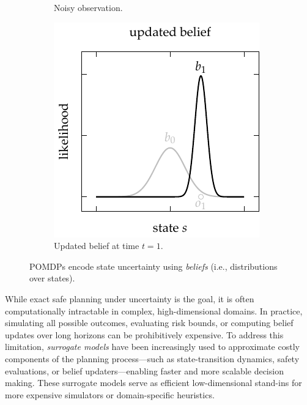 \begin{figure}[t!]
\begin{subfigure}[t]{0.30\linewidth}
        \caption{Noisy observation.}
        \label{fig:belief2}
    \end{subfigure}
    \hfill
    \begin{subfigure}[t]{0.30\linewidth}
        \centering
        \includegraphics[width=\linewidth]{diagrams/introduction/belief3.pdf}
        \caption{Updated belief at time $t=1$.}
        \label{fig:belief3}
    \end{subfigure}
    \caption{POMDPs encode state uncertainty using \textit{beliefs} (i.e., distributions over states).}
    \label{fig:beliefs}
\end{figure}


While exact safe planning under uncertainty is the goal, it is often computationally intractable in complex, high-dimensional domains.
In practice, simulating all possible outcomes, evaluating risk bounds, or computing belief updates over long horizons can be prohibitively expensive.
To address this limitation, \textit{surrogate models} \cite{forrester2008engineering,goodfellow2016deep} have been increasingly used to approximate costly components of the planning process---such as state-transition dynamics, safety evaluations, or belief updaters---enabling faster and more scalable decision making.
These surrogate models serve as efficient low-dimensional stand-ins for more expensive simulators or domain-specific heuristics.


